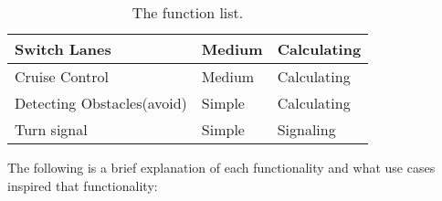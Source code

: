 \begin{table}[H]
\begin{tabular}{|l|l|l|}
Switch Lanes                                       & Medium     & Calculating  \\ \hline
Cruise Control                                     & Medium     & Calculating  \\ \hline
Detecting Obstacles(avoid)                         & Simple     & Calculating    \\ \hline
Turn signal                                        & Simple     & Signaling    \\ \hline
\end{tabular}
\caption{The function list.}
\label{functionlist}
\end{table}

The following is a brief explanation of each functionality and what use cases inspired that functionality:
